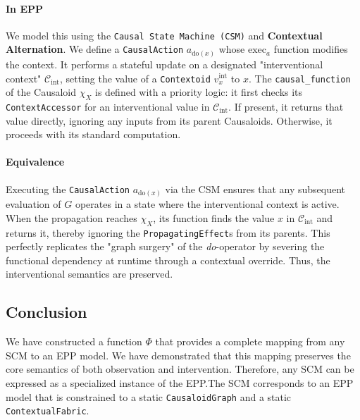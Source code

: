 \paragraph{In EPP} We model this using the \texttt{Causal State Machine (CSM)} and \textbf{Contextual Alternation}. We define a \texttt{CausalAction} \(a_{\text{do}(x)}\) whose \(\text{exec}_a\) function modifies the context. It performs a stateful update on a designated "interventional context" \(\mathcal{C}_{\text{int}}\), setting the value of a \texttt{Contextoid} \(v_x^{\text{int}}\) to \(x\). The \texttt{causal\_function} of the Causaloid \(\chi_X\) is defined with a priority logic: it first checks its \texttt{ContextAccessor} for an interventional value in \(\mathcal{C}_{\text{int}}\). If present, it returns that value directly, ignoring any inputs from its parent Causaloids. Otherwise, it proceeds with its standard computation.

\paragraph{Equivalence} Executing the \texttt{CausalAction} \(a_{\text{do}(x)}\) via the CSM ensures that any subsequent evaluation of \(G\) operates in a state where the interventional context is active. When the propagation reaches \(\chi_X\), its function finds the value \(x\) in \(\mathcal{C}_{\text{int}}\) and returns it, thereby ignoring the \texttt{PropagatingEffect}s from its parents. This perfectly replicates the "graph surgery" of the \textit{do}-operator by severing the functional dependency at runtime through a contextual override. Thus, the interventional semantics are preserved.

\subsection*{Conclusion}
We have constructed a function \(\Phi\) that provides a complete mapping from any SCM to an EPP model. We have demonstrated that this mapping preserves the core semantics of both observation and intervention. Therefore, any SCM can be expressed as a specialized instance of the EPP.The SCM corresponds to an EPP model that is constrained to a static \texttt{CausaloidGraph} and a static \texttt{ContextualFabric}.


\newpage